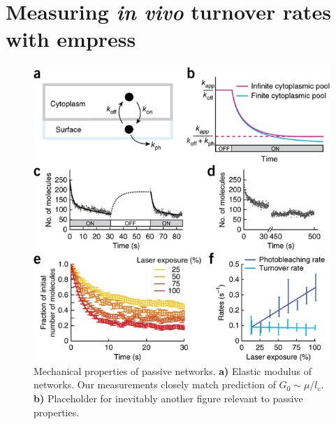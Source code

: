 \section{Measuring \textit{in vivo} turnover rates with empress}


\begin{figure}[h!]
\centering
\includegraphics[width=\hsize]{nmeth/nmeth.jpg}
\caption{\label{fig:passive_supp}  Mechanical properties of passive networks.  \textbf{a)} Elastic modulus of networks.  Our measurements closely match prediction of $G_0\sim\mu/l_c$.  \textbf{b)}  Placeholder for inevitably another figure relevant to passive properties.}
\end{figure}